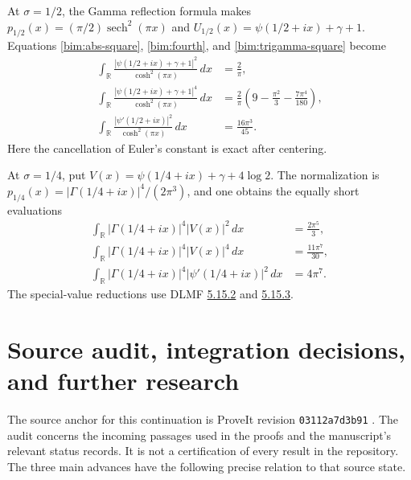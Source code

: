 \documentclass[11pt,a4paper]{article}
\numberwithin{equation}{section}
\theoremstyle{definition}
\theoremstyle{remark}
\begin{document}
At $\sigma=1/2$, the Gamma reflection formula makes
$p_{1/2}(x)=(\pi/2)\operatorname{sech}^2(\pi x)$ and
$U_{1/2}(x)=\psi(1/2+ix)+\gamma+1$.  Equations
\eqref{bim:abs-square}, \eqref{bim:fourth}, and
\eqref{bim:trigamma-square} become
\begin{align}
 \int_{\mathbb R}\frac{|\psi(1/2+ix)+\gamma+1|^2}
                            {\cosh^2(\pi x)}\,dx
                   &=\frac2\pi,\label{bim:half-square}\\
 \int_{\mathbb R}\frac{|\psi(1/2+ix)+\gamma+1|^4}
                            {\cosh^2(\pi x)}\,dx
                   &=\frac2\pi\left(9-\frac{\pi^2}{3}
                                          -\frac{7\pi^4}{180}\right),
                                               \label{bim:half-fourth}\\
 \int_{\mathbb R}\frac{|\psi'(1/2+ix)|^2}
                            {\cosh^2(\pi x)}\,dx
                   &=\frac{16\pi^3}{45}.\label{bim:half-trigamma}
\end{align}
Here the cancellation of Euler's constant is exact after centering.

At $\sigma=1/4$, put $V(x)=\psi(1/4+ix)+\gamma+4\log2$.
The normalization is $p_{1/4}(x)=|\Gamma(1/4+ix)|^4/(2\pi^3)$, and
one obtains the equally short evaluations
\begin{align}
 \int_{\mathbb R}|\Gamma(1/4+ix)|^4|V(x)|^2\,dx&=\frac{2\pi^5}{3},
                                                   \label{bim:quarter-square}\\
 \int_{\mathbb R}|\Gamma(1/4+ix)|^4|V(x)|^4\,dx&=\frac{11\pi^7}{30},
                                                   \label{bim:quarter-fourth}\\
 \int_{\mathbb R}|\Gamma(1/4+ix)|^4|\psi'(1/4+ix)|^2\,dx&=4\pi^7.
                                                   \label{bim:quarter-trigamma}
\end{align}
The special-value reductions use DLMF
\href{https://dlmf.nist.gov/5.15.E2}{5.15.2} and
\href{https://dlmf.nist.gov/5.15.E3}{5.15.3}.



\section{Source audit, integration decisions, and further research}
\label{status:section}

The source anchor for this continuation is ProveIt revision
\texttt{03112a7d3b91} \cite{ProveIt}.
The audit concerns the incoming passages used in the proofs and the
manuscript's relevant status records. It is not a certification of
every result in the repository. The three main advances have the
following precise relation to that source state.
\end{document}
